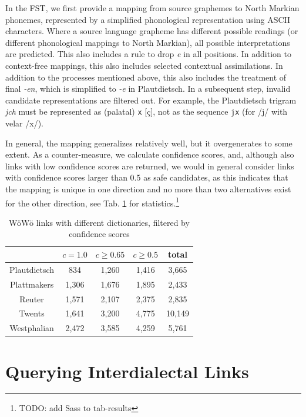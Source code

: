 \documentclass[11pt]{article}
\newcommand{\word}[1]{\textsl{#1}} %
\newcommand{\code}[1]{\texttt{#1}} %
\newcommand{\todo}[1]{\footnote{\huge{TODO:} #1}}     %
\begin{document}
In the FST, we first provide a mapping from source graphemes to North Markian phonemes, represented by a simplified phonological representation using ASCII characters. Where a source language grapheme has different possible readings (or different phonological mappings to North Markian), all possible interpretations are predicted. This also includes a rule to drop \word{e} in all positions. In addition to context-free mappings, this also includes selected contextual assimilations. In addition to the processes mentioned above, this also includes the treatment of final \word{-en}, which is simplified to \word{-e} in Plautdietsch. In a subsequent step, invalid candidate representations are filtered out. For example, the Plautdietsch trigram \word{jch} must be represented as (palatal) \code{x} [ç], not as the sequence \code{jx} (for /j/ with velar /x/).

In general, the mapping generalizes relatively well, but it overgenerates to some extent. As a counter-measure, we calculate confidence scores, and, although also links with low confidence scores are returned, we would in general consider links with confidence scores larger than 0.5 as safe candidates, as this indicates that the mapping is unique in one direction and no more than two alternatives exist for the other direction, see Tab. \ref{tab-results} for statistics.\todo{add Sass to tab-results}



\begin{table}
{\small
\begin{tabular}{ccccc}
                & $c=1.0$   & $c\geq 0.65$  & $c \geq 0.5$  & total \\ \hline
Plautdietsch    & 834       & 1,260          & 1,416          & 3,665 \\
Plattmakers     & 1,306     & 1,676          & 1,895          & 2,433 \\
Reuter          & 1,571     & 2,107          & 2,375          & 2,835 \\
Twents          & 1,641     & 3,200          & 4,775          & 10,149\\
Westphalian     & 2,472     & 3,585          & 4,259          & 5,761 \\
\hline
\end{tabular}
} %
\caption{WöWö links with different dictionaries, filtered by confidence scores}
\label{tab-results}
\end{table}


\section{Querying Interdialectal Links}
\end{document}
